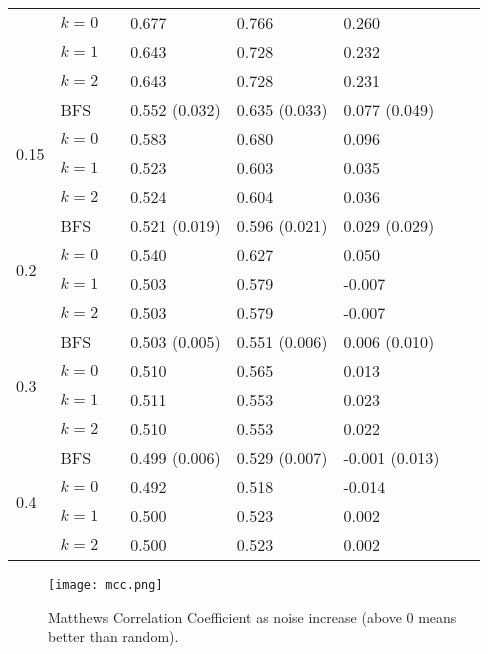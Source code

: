 \documentclass[a4paper,final,notitlepage,11pt,svgnames]{scrartcl}
\begin{document}
\begin{table}[htpb]
\begin{tabular}{llllllll}
& $k=0$ & & 0.677         & 0.766         & 0.260  & & \\
& $k=1$ & & 0.643         & 0.728         & 0.232  & & \\
& $k=2$ & & 0.643         & 0.728         & 0.231  & & \\
\multirow{4}{*}{0.15} & BFS & & 0.552 (0.032) & 0.635 (0.033) & 0.077 (0.049)  & & \\
& $k=0$ & & 0.583         & 0.680         & 0.096  & & \\
& $k=1$ & & 0.523         & 0.603         & 0.035  & & \\
& $k=2$ & & 0.524         & 0.604         & 0.036  & & \\
\multirow{4}{*}{0.2} & BFS & & 0.521 (0.019) & 0.596 (0.021) & 0.029 (0.029)  & & \\
& $k=0$ & & 0.540         & 0.627         & 0.050  & & \\
& $k=1$ & & 0.503         & 0.579         & -0.007  & & \\
& $k=2$ & & 0.503         & 0.579         & -0.007  & & \\
\multirow{4}{*}{0.3} & BFS & & 0.503 (0.005) & 0.551 (0.006) & 0.006 (0.010)  & & \\
& $k=0$ & & 0.510         & 0.565         & 0.013  & & \\
& $k=1$ & & 0.511         & 0.553         & 0.023  & & \\
& $k=2$ & & 0.510         & 0.553         & 0.022  & & \\
\multirow{4}{*}{0.4} & BFS & & 0.499 (0.006) & 0.529 (0.007) & -0.001 (0.013)  & & \\
& $k=0$ & & 0.492         & 0.518         & -0.014  & & \\
& $k=1$ & & 0.500         & 0.523         & 0.002  & & \\
& $k=2$ & & 0.500         & 0.523         & 0.002  & & \\
		\bottomrule
	\end{tabular}
\end{table}

\begin{figure}[htpb]
	\centering
	\texttt{[image: mcc.png]}
	\caption{Matthews Correlation Coefficient as noise increase (above 0 means better than random).
	\label{fig:mcc}}
\end{figure}
\end{document}
